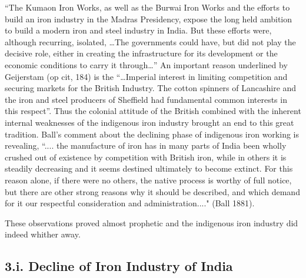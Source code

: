 {\footnotesize{“The Kumaon Iron Works, as well as the Burwai Iron Works and the efforts to build an iron industry in the Madras Presidency, expose the long held ambition to build a modern iron and steel industry in India. But these efforts were, although recurring, isolated, …The governments could have, but did not play the decisive role, either in creating the infrastructure for its development or the economic conditions to carry it through…”}} An important reason underlined by Geijerstam (op cit, 184) is the {\footnotesize{“…Imperial interest in limiting competition and securing markets for the British Industry. The cotton spinners of Lancashire and the iron and steel producers of Sheffield had fundamental common interests in this respect”. Thus the colonial attitude of the British combined with the inherent internal weaknesses of the indigenous iron industry brought an end to this great tradition. Ball's comment about the declining phase of indigenous iron working is revealing, ``.... the manufacture of iron has in many parts of India been wholly crushed out of existence by competition with British iron, while in others it is steadily decreasing and it seems destined ultimately to become extinct.  For this reason alone, if there were no others, the native process is worthy of full notice, but there are other strong reasons why it should be described, and which demand for it our respectful consideration and administration...."}} (Ball 1881).

These observations proved almost prophetic and the indigenous iron industry did indeed whither away. 

\vspace{-.2cm}

\subsection*{3.i.  Decline of Iron Industry of India}\label{chapter6-subsection-3.i}

\vspace{-.1cm}

